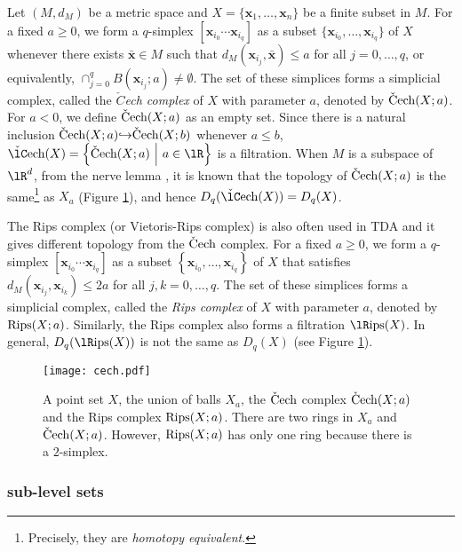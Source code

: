 \documentclass{article}
\newcommand{\hra}{{\hookrightarrow}}
\newcommand{\cech}{{\rm \check{C}ech}}
\newcommand{\Cech}{{\rm \check{\lC}ech}}
\newcommand{\Rips}{{\rm {\lR}ips}}
\begin{document}
Let $(M,d_M)$ be a metric space and $X= \{\bm{x}_1, \ldots, \bm{x}_n \}$ be a finite subset in $M$.
For a fixed $a \geq 0$, we form a $q$-simplex $[\bm{x}_{i_0} \cdots \bm{x}_{i_q}]$ as a subset $\{ \bm{x}_{i_0}, \ldots, \bm{x}_{i_q} \}$ of $X$ whenever there exists $\bar{\bm{x}} \in M$ such that $d_M(\bm{x}_{i_j},\bar{\bm{x}}) \leq a$ for all $j=0,\ldots,q$, or equivalently, $\cap^{q}_{j = 0} B(\bm{x}_{i_{j}}; a) \neq \emptyset$.
The set of these simplices forms a simplicial complex, called the $\check{C}${\em ech complex} of $X$ with parameter $a$, denoted by $\cech(X;a)$.
For $a < 0$, we define $\cech(X;a)$ as an empty set.
Since there is a natural inclusion $\cech(X;a) \hra \cech(X;b)$ whenever $a \leq b$, $\Cech(X)=\left\{\cech(X;a) \ \middle| \ a \in \lR \right\}$ is a filtration.
When $M$ is a subspace of $\lR^{d}$, from the nerve lemma \cite{Ha02}, it is known that the topology of $\cech(X;a)$ is the same\footnote{Precisely, they are {\em homotopy equivalent}.} as $X_{a}$ (Figure \ref{fig:cech}), and hence $D_{q}(\Cech(X))=D_{q}(X)$.

The Rips complex (or Vietoris-Rips complex) is also often used in TDA and it gives different topology from the $\cech$ complex.
For a fixed $a \geq 0$, we form a $q$-simplex $[\bm{x}_{i_0} \cdots \bm{x}_{i_q}]$ as a subset $\left\{ \bm{x}_{i_0}, \ldots , \bm{x}_{i_q} \right\}$ of $X$ that satisfies $d_M(\bm{x}_{i_j},\bm{x}_{i_k}) \leq 2a$ for all $j,k=0,\ldots ,q$.
The set of these simplices forms a simplicial complex, called the {\em Rips complex} of $X$ with parameter $a$, denoted by ${\rm Rips}(X;a)$.
Similarly, the Rips complex also forms a filtration $\Rips(X)$.
In general, $D_{q}(\Rips(X))$ is not the same as $D_{q}(X)$ (see Figure \ref{fig:cech}).

\begin{figure}[htbp]
\begin{center}
\texttt{[image: cech.pdf]}
\end{center}
\caption{A point set $X$, the union of balls $X_{a}$, the $\cech$ complex $\cech(X;a)$ and the Rips complex ${\rm Rips}(X;a)$. There are two rings in $X_{a}$ and $\cech(X;a)$. However, ${\rm Rips}(X;a)$ has only one ring because there is a $2$-simplex.}
\label{fig:cech}
\end{figure}


\subsubsection{sub-level sets}
\end{document}
